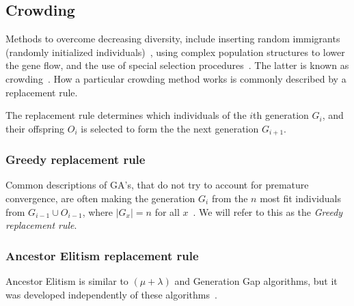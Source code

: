 \subsection{Crowding}
Methods to overcome decreasing diversity, include inserting random immigrants (randomly initialized individuals)~\cite{Cobb93geneticalgorithms}, using complex population structures to lower the gene flow, and the use of special selection procedures~\cite{ursem2002diversity}. The latter is known as crowding~\cite{DeJong:1975:ABC:907087}. How a particular crowding method works is commonly described by a replacement rule.

The replacement rule determines which individuals of the $i$th generation $G_i$,
and their offspring $O_i$ is selected to form the the next generation $G_{i+1}$.

\subsubsection{Greedy replacement rule}
Common descriptions of GA's, that do not try to account for premature convergence,
are often making the generation $G_i$ from the $n$ most fit individuals from $G_{i-1} \cup O_{i-1}$, where $\lvert G_x \rvert = n$ for all $x$~\cite{masterThesisGANN}.
We will refer to this as the \emph{Greedy replacement rule}.

%
%

\subsubsection{Ancestor Elitism replacement rule}
Ancestor Elitism is similar to $(\mu + \lambda)$ and Generation Gap algorithms, but it was developed independently of these algorithms~\cite[p. 34, p. 50]{Luke2013Metaheuristics}.

